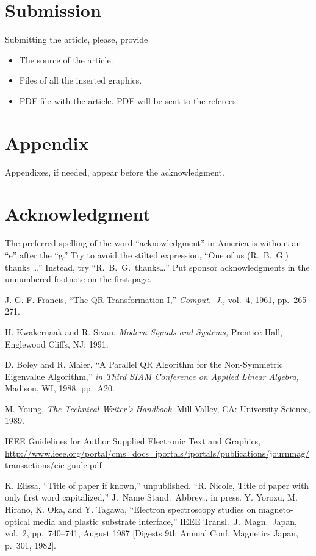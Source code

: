 \documentclass[conference]{IEEEtran}
\theoremstyle{definition}
\begin{document}
\section{Submission}
Submitting the article, please, provide
\begin{itemize}
\item The source of the article.
\item Files of all the inserted graphics.
\item PDF file with the article. PDF will be sent to the referees.
\end{itemize}

\section*{Appendix}
Appendixes, if needed, appear before the acknowledgment.

\section*{Acknowledgment}
The preferred spelling of the word ``acknowledgment'' in America is without an ``e'' after the ``g.''  Try to avoid the stilted expression, ``One of us (R.~B.~G.) thanks \dots'' Instead, try ``R.~B.~G.\ thanks\dots''  Put sponsor acknowledgments in the unnumbered footnote on the first page.


\begin{thebibliography}{99}

J. G. F. Francis, ``The QR Transformation I,'' {\it Comput.\ J.,} vol.~4, 1961, pp.~265--271.

H. Kwakernaak and R. Sivan, {\it Modern Signals and Systems,} Prentice Hall, Englewood Cliffs, NJ; 1991.

D. Boley and R. Maier, ``A Parallel QR Algorithm for the Non-Symmetric Eigenvalue Algorithm,'' {\it in Third SIAM Conference on Applied Linear Algebra,} Madison, WI, 1988, pp.~A20.


M. Young, {\it The Technical Writer's Handbook.} Mill Valley, CA:  University Science, 1989.

IEEE Guidelines for Author
Supplied Electronic
Text and Graphics, \url{http://www.ieee.org/portal/cms_docs_iportals/iportals/publications/journmag/transactions/eic-guide.pdf}

 K. Elissa, ``Title of paper if known,'' unpublished.
 ``R. Nicole, Title of paper with only first word capitalized,'' J.\ Name Stand.\ Abbrev., in press.
 Y. Yorozu, M. Hirano, K. Oka, and Y. Tagawa, ``Electron spectroscopy studies on magneto-optical media and plastic substrate interface,'' IEEE Transl.\ J.\ Magn.\ Japan, vol.~2, pp.~740--741, August 1987 [Digests 9th Annual Conf. Magnetics Japan, p.~301, 1982].

\end{thebibliography}
\end{document}
